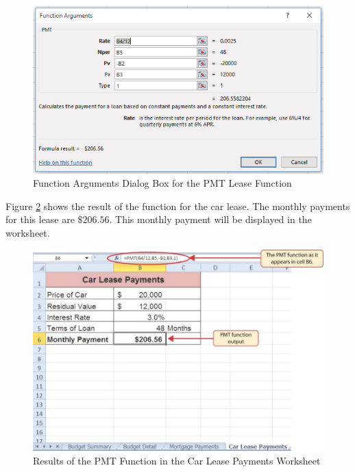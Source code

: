 \begin{figure}[H]
	\centering
	\includegraphics[width=\maxwidth{.95\linewidth}]{gfx/ch02_fig34}
	\caption{Function Arguments Dialog Box for the PMT Lease Function}
	\label{02:fig34}
\end{figure}

Figure \ref{02:fig35} shows the result of the  function for the car lease. The monthly payments for this lease are $ \$206.56 $. This monthly payment will be displayed in the  worksheet.

\begin{figure}[H]
	\centering
	\includegraphics[width=\maxwidth{.95\linewidth}]{gfx/ch02_fig35}
	\caption{Results of the PMT Function in the Car Lease Payments Worksheet}
	\label{02:fig35}
\end{figure}


